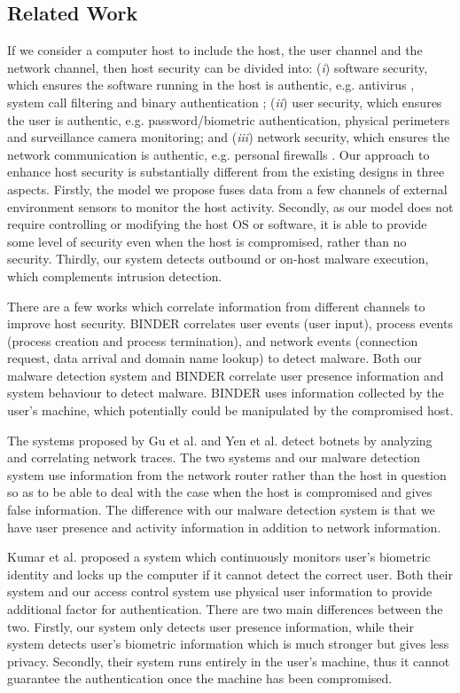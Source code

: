 \subsection{Related Work}
\label{sec:related}

If we consider a computer host to include the host, the user channel
and the network channel, then host security can be divided into:
({\it i}) software security, which ensures the software running in
the host is authentic, e.g. antivirus \cite{aveff}, system call
filtering \cite{systrace} and binary authentication \cite{binauth};
({\it ii}) user security, which ensures the user is authentic, e.g.
password/biometric authentication, physical perimeters and
surveillance camera monitoring; and ({\it iii}) network security,
which ensures the network communication is authentic, e.g. personal
firewalls \cite{firewallsurvey}. Our approach to enhance host
security is substantially different from the existing designs in
three aspects. Firstly, the model we propose fuses data from a few
channels of external environment sensors to monitor the host
activity. Secondly, as our model does not require controlling or
modifying the host OS or software, it is able to provide some
level of security even when the host is compromised, rather than no security. 
Thirdly, our system
detects outbound or on-host malware execution, which complements
intrusion detection.

There are a few works which correlate information from different
channels to improve host security. BIND\-ER \cite{binder}
correlates user events (user input), process even\-ts (process
creation and process termination), and network events (connection
request, data arrival and domain name lookup) to detect malware.
Both our malware detection system and BINDER correlate user presence
information and system behaviour to detect malware. BINDER uses
information collected by the user's machine, which potentially could
be manipulated by the compromised host.

The systems proposed by Gu et al. \cite{bothunter} and Yen et al.
\cite{trafagg} detect botnets by analyzing and correlating network
traces. The two systems and our malware detection system use
information from the network router rather than the host in question
so as to be able to deal with the case when the host is compromised
and gives false information. The difference with our malware
detection system is that we have user presence and activity
information in addition to network information.

Kumar et al. proposed a system 
\cite{biomon,biomon-win,biomon2} which continuously monitors
user's biometric identity and locks up the computer if it cannot detect
the correct user.
Both their system and our access control system use physical user
information to provide additional factor for authentication.
There are two main differences between the two.
Firstly, our system only detects user presence information, while
their system detects user's biometric information which is much
stronger but gives less privacy.
Secondly, their system runs entirely in the user's machine, thus
it cannot guarantee the authentication once the machine has been compromised.

